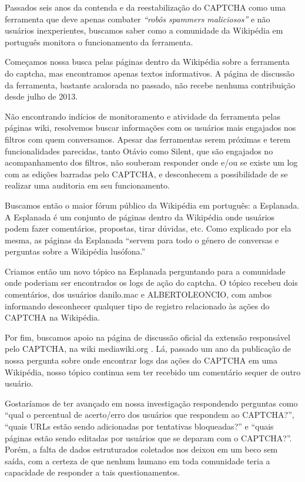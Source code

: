 
Passados seis anos da contenda e da reestabilização do CAPTCHA como uma ferramenta que deve apenas combater \textit{“robôs spammers maliciosos”} e não usuários inexperientes, buscamos saber como a comunidade da Wikipédia em português monitora o funcionamento da ferramenta.

Começamos nossa busca pelas páginas dentro da Wikipédia sobre a ferramenta do captcha, mas encontramos apenas textos informativos. A página de discussão da ferramenta, bastante acalorada no passado, não recebe nenhuma contribuição desde julho de 2013.

Não encontrando indícios de monitoramento e atividade da ferramenta pelas páginas wiki, resolvemos buscar informações com os usuários mais engajados nos filtros com quem conversamos. Apesar das ferramentas serem próximas e terem funcionalidades parecidas, tanto Otávio como Silent, que são engajados no acompanhamento dos filtros, não souberam responder onde e/ou se existe um log com as edições barradas pelo CAPTCHA, e desconhecem a possibilidade de se realizar uma auditoria em seu funcionamento. 

Buscamos então o maior fórum público da Wikipédia em português: a Esplanada. A Esplanada é um conjunto de páginas dentro da Wikipédia onde usuários podem fazer comentários, propostas, tirar dúvidas, etc. Como explicado por ela mesma, as páginas da Esplanada “servem para todo o género de conversas e perguntas sobre a Wikipédia lusófona.” 

Criamos então um novo tópico na Esplanada perguntando para a comunidade onde poderiam ser encontrados os logs de ação do captcha.   O tópico recebeu dois comentários, dos usuários danilo.mac e ALBERTOLEONCIO, com ambos informando desconhecer qualquer tipo de registro relacionado às ações do CAPTCHA na Wikipédia.

Por fim, buscamos apoio na página de discussão oficial da extensão responsável pelo CAPTCHA, na wiki mediawiki.org . Lá, passado um ano da publicação de nossa pergunta sobre onde encontrar logs das ações do CAPTCHA em uma Wikipédia, nosso tópico continua sem ter recebido um comentário sequer de outro usuário. 

Gostaríamos de ter avançado em nossa investigação respondendo perguntas como ``qual o percentual de acerto/erro dos usuários que respondem ao CAPTCHA?'', “quais URLs estão sendo adicionadas por tentativas bloqueadas?” e “quais páginas estão sendo editadas por usuários que se deparam com o CAPTCHA?”. Porém, a falta de dados estruturados coletados nos deixou em um beco sem saída, com a certeza de que nenhum humano em toda comunidade teria a capacidade de responder a tais questionamentos.

